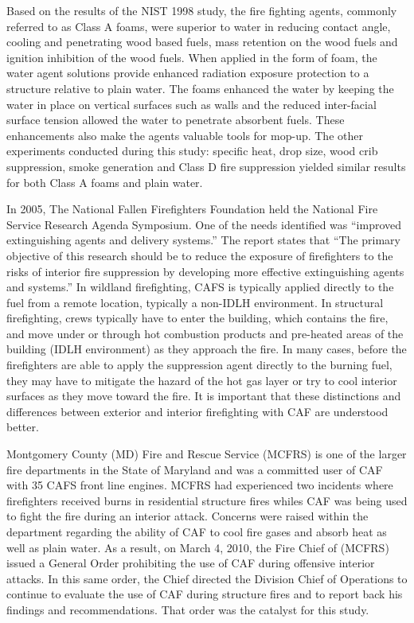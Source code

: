\documentclass[12pt,oneside]{book}
\begin{document}
Based on the results of the NIST 1998 study, the fire fighting agents, commonly referred to as Class A foams, were superior to water in reducing contact angle, cooling and penetrating wood based fuels, mass retention on the wood fuels and ignition inhibition of the wood fuels.  When applied in the form of foam, the water agent solutions provide enhanced radiation exposure protection to a structure relative to plain water. The foams enhanced the water by keeping the water in place on vertical surfaces such as walls and the reduced inter-facial surface tension allowed the water to penetrate absorbent fuels. These enhancements also make the agents valuable tools for mop-up. The other experiments conducted during this study: specific heat, drop size, wood crib suppression, smoke generation and Class D fire suppression yielded similar results for both Class A foams and plain water.

In 2005, The National Fallen Firefighters Foundation held the National Fire Service Research Agenda Symposium.  One of the needs identified was ``improved extinguishing agents and delivery systems.'' The report states that ``The primary objective of this research should be to reduce the exposure of firefighters to the risks of interior fire suppression by developing more effective extinguishing agents and systems.'' In wildland firefighting, CAFS is typically applied directly to the fuel from a remote location, typically a non-IDLH environment. In structural firefighting, crews typically  have to enter the building, which contains the fire, and move under or through hot combustion products and pre-heated areas of the building (IDLH environment) as they approach the fire. In many cases, before the firefighters are able to apply the suppression agent directly to the burning fuel, they may have to mitigate the hazard of the hot gas layer or try to cool interior surfaces as they move toward the fire. It is important that these distinctions and differences between exterior and interior firefighting with CAF are understood better.

Montgomery County (MD) Fire and Rescue Service (MCFRS) is one of the larger fire departments in the State of Maryland and was a committed user of CAF with 35 CAFS front line engines. MCFRS had experienced two incidents where firefighters received burns in residential structure fires whiles CAF was being used to fight the fire during an interior attack. Concerns were raised within the department regarding the ability of CAF to cool fire gases and absorb heat as well as plain water. As a result, on March 4, 2010, the Fire Chief of (MCFRS) issued a General Order prohibiting the use of CAF during offensive interior attacks. In this same order, the Chief directed the Division Chief of Operations to continue to evaluate the use of CAF during structure fires and to report back his findings and recommendations. That order was the catalyst for this study.
\end{document}
